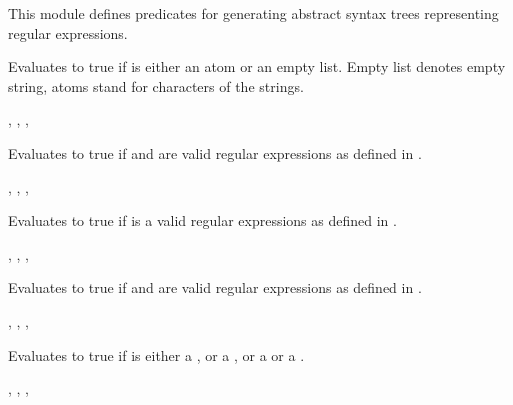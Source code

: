 This module defines predicates for generating abstract syntax trees
representing regular expressions.\vspace{0.7cm}

\begin{description}
Evaluates to true if  is either an atom or an empty list.
Empty list denotes empty string, atoms stand for characters of
the strings.

\begin{tags}
, , , 
\end{tags}

Evaluates to true if  and  are valid regular expressions
as defined in .

\begin{tags}
, , , 
\end{tags}

Evaluates to true if  is a valid regular expressions
as defined in .

\begin{tags}
, , , 
\end{tags}

Evaluates to true if  and  are valid regular expressions
as defined in .

\begin{tags}
, , , 
\end{tags}

Evaluates to true if  is either a , or a , or
a  or a .

\begin{tags}
, , , 
\end{tags}
\end{description}


